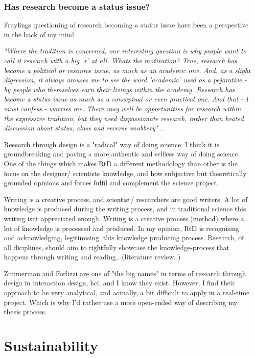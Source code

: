 \subsubsection{Has research become a status issue?}
Fraylings questioning of research becoming a status issue have been a perspective in the back of my mind 

\emph{"Where the tradition is concerned, one interesting question is why people want to call it research with a big 'r' at all. Whats the motivation? True, research has become a political or resource issue, as much as an academic one. And, as a slight digression, it always amuses me to see the word 'academic' used as a pejorative - by people who themselves earn their livings within the academy. Research has become a status issue as much as a conceptual or even practical one. And that - I must confess - worries me. There may well be opportunities for research within the expressive tradition, but they need dispassionate research, rather than heated discussion about status, class and reverse snobbery"} \autocite[p. 5]{frayling_1994}.




Research through design is a "radical" way of doing science. I think it is groundbreaking and paving a more authentic and selfless way of doing science. One of the things which makes RtD a different methodology than other is the focus on the designer/ scientists knowledge, and how subjective but theoretically grounded opinions and forces fulfil and complement the science project. 

Writing is a creative process, and scientist/ researchers are good writers. A lot of knowledge is produced during the writing process, and in traditional science this writing isnt appreciated enough. Writing is a creative process (method) where a lot of knowledge is processed and produced. In my opinion, RtD is recognising and acknowledging, legitimising, this knowledge producing process. Research, of all diciplines, should aim to rightfully showcase the knowledge-process that happens through writing and reading..  (literature review..)

Zimmerman and Forlizzi are one of "the big names" in terms of research through design in interaction design, hci, and I know they exist. However, I find their approach to be very analytical, and actually, a bit difficult to apply in a real-time project. Which is why I'd rather use a more open-ended way of describing my thesis process.


\section{Sustainability}

